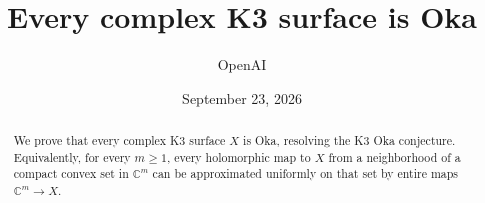 \documentclass[11pt]{article}
\title{Every complex K3 surface is Oka}
\author{OpenAI}
\date{September 23, 2026}
\theoremstyle{definition}
\newcommand{\C}{\mathbb C}
\numberwithin{equation}{section}
\begin{document}
\maketitle
\begin{abstract}
We prove that every complex K3 surface $X$ is Oka, resolving the K3 Oka
conjecture. Equivalently, for every $m\geq1$, every holomorphic map to $X$
from a neighborhood of a compact convex set in $\C^m$ can be approximated
uniformly on that set by entire maps $\C^m\to X$.
\end{abstract}
{\small\tableofcontents}















\end{document}
